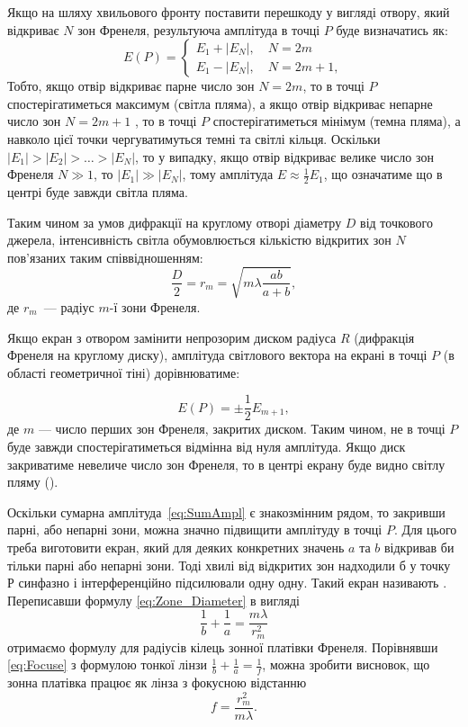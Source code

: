 Якщо на шляху хвильового фронту поставити перешкоду у вигляді отвору, який відкриває $N$ зон Френеля, результуюча амплітуда в точці $P$ буде визначатись як:
\begin{equation}\label{eq:Amplitide_of_holes}
    E(P) =
    \begin{cases}
        E_1 + |E_N|, \quad N = 2m \\
        E_1 - |E_N|, \quad N = 2m+1,
    \end{cases}
\end{equation}
Тобто, якщо отвір відкриває парне число зон $N = 2m$, то в точці $P$ спостерігатиметься максимум (світла пляма), а якщо отвір відкриває непарне число зон  $N = 2m + 1$ , то в точці $P$ спостерігатиметься мінімум (темна пляма), а навколо цієї точки чергуватимуться темні та світлі кільця. Оскільки $|E_1|>|E_2|> \ldots >|E_N|$, то у випадку, якщо отвір відкриває велике число зон Френеля $N \gg 1$, то $|E_1| \gg |E_N| $, тому амплітуда $E \approx \frac12 E_1$, що означатиме що в центрі буде завжди світла пляма.

Таким чином за умов дифракції на круглому отворі діаметру $D$ від точкового джерела, інтенсивність світла обумовлюється кількістю відкритих зон $N$ пов'язаних таким співвідношенням:
\begin{equation}\label{eq:Zone_Diameter}
    \frac{D}{2}=r_{m}=\sqrt{m\lambda\frac{ab}{a+b}},
\end{equation}
де $r_{m}$~--- радіус $m$-ї зони Френеля.

Якщо екран з отвором замінити непрозорим диском радіуса $R$ (дифракція Френеля на круглому диску), амплітуда світлового вектора на екрані в точці $P$ (в області геометричної тіні) дорівнюватиме:

\begin{equation}\label{eq:Amplitide_of_disk}
    E(P) = \pm \frac12 E_{m+1},
\end{equation}
де $ m $ --- число перших зон Френеля, закритих диском.
Таким чином, не в точці $P$ буде завжди спостерігатиметься відмінна від нуля амплітуда. Якщо диск закриватиме невеличе число зон Френеля, то в центрі екрану буде видно світлу пляму ().

Оскільки сумарна амплітуда~\eqref{eq:SumAmpl} є знакозмінним рядом, то закривши парні, або непарні зони, можна значно підвищити амплітуду в точці $P$. Для цього треба виготовити екран, який для деяких конкретних значень $a$ та $b$ відкривав би тільки парні або непарні зони. Тоді хвилі від відкритих зон надходили б у точку $Р$ синфазно і інтерференційно підсилювали одну одну. Такий екран називають . Переписавши формулу \eqref{eq:Zone_Diameter} в вигляді
\begin{equation}\label{eq:Focuse}
    \frac1b+\frac1a=\frac{m\lambda}{r_{m}^{2}}
\end{equation}
отримаємо формулу для радіусів кілець зонної платівки Френеля. Порівнявши \eqref{eq:Focuse} з формулою тонкої лінзи $\frac1b + \frac1a  = \frac1f$, можна зробити висновок, що зонна платівка працює як лінза з фокусною відстанню
\begin{equation}
    f=\frac{r^{2}_{m}}{m\lambda}.
\end{equation}

